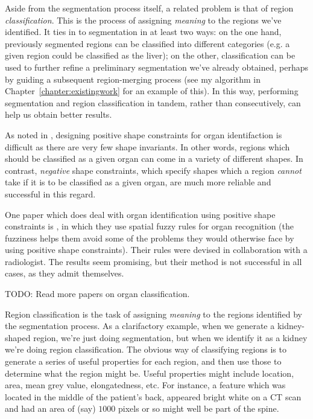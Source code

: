 Aside from the segmentation process itself, a related problem is that of region \emph{classification}. This is the process of assigning \emph{meaning} to the regions we've identified. It ties in to segmentation in at least two ways: on the one hand, previously segmented regions can be classified into different categories (e.g. a given region could be classified as the liver); on the other, classification can be used to further refine a preliminary segmentation we've already obtained, perhaps by guiding a subsequent region-merging process (see my algorithm in Chapter~\ref{chapter:existingwork} for an example of this). In this way, performing segmentation and region classification in tandem, rather than consecutively, can help us obtain better results.

As noted in \cite{kobashi95}, designing positive shape constraints for organ identifaction is difficult as there are very few shape invariants. In other words, regions which should be classified as a given organ can come in a variety of different shapes. In contrast, \emph{negative} shape constraints, which specify shapes which a region \emph{cannot} take if it is to be classified as a given organ, are much more reliable and successful in this regard.

One paper which does deal with organ identification using positive shape constraints is \cite{lee03}, in which they use spatial fuzzy rules for organ recognition (the fuzziness helps them avoid some of the problems they would otherwise face by using positive shape constraints). Their rules were devised in collaboration with a radiologist. The results seem promising, but their method is not successful in all cases, as they admit themselves.

TODO: Read more papers on organ classification.

\fi

Region classification is the task of assigning \emph{meaning} to the regions identified by the segmentation process. As a clarifactory example, when we generate a kidney-shaped region, we're just doing segmentation, but when we identify it as a kidney we're doing region classification. The obvious way of classifying regions is to generate a series of useful properties for each region, and then use those to determine what the region might be. Useful properties might include location, area, mean grey value, elongatedness, etc. For instance, a feature which was located in the middle of the patient's back, appeared bright white on a CT scan and had an area of (say) $1000$ pixels or so might well be part of the spine.

